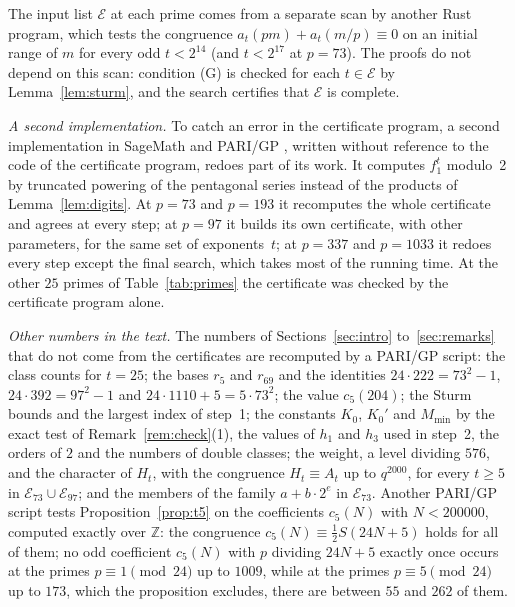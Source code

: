 \documentclass[12pt]{amsart}
\theoremstyle{definition}
\newcommand{\Z}{\mathbb{Z}}
\newcommand{\cE}{\mathcal{E}}
\begin{document}
The input list $\cE$ at each prime comes from a separate scan by another Rust program, which tests the congruence $a_t(pm)+a_t(m/p)\equiv0$ on an initial range of $m$ for every odd $t<2^{14}$ (and $t<2^{17}$ at $p=73$). The proofs do not depend on this scan: condition (G) is checked for each $t\in\cE$ by Lemma~\ref{lem:sturm}, and the search certifies that $\cE$ is complete.

\emph{A second implementation.} To catch an error in the certificate program, a second implementation in SageMath \cite{Sage} and PARI/GP \cite{PARI}, written without reference to the code of the certificate program, redoes part of its work. It computes $f_1^t$ modulo~2 by truncated powering of the pentagonal series instead of the products of Lemma~\ref{lem:digits}. At $p=73$ and $p=193$ it recomputes the whole certificate and agrees at every step; at $p=97$ it builds its own certificate, with other parameters, for the same set of exponents~$t$; at $p=337$ and $p=1033$ it redoes every step except the final search, which takes most of the running time. At the other $25$ primes of Table~\ref{tab:primes} the certificate was checked by the certificate program alone.

\emph{Other numbers in the text.} The numbers of Sections~\ref{sec:intro} to~\ref{sec:remarks} that do not come from the certificates are recomputed by a PARI/GP script: the class counts for $t=25$; the bases $r_5$ and $r_{69}$ and the identities $24\cdot222=73^2-1$, $24\cdot392=97^2-1$ and $24\cdot1110+5=5\cdot73^2$; the value $c_5(204)$; the Sturm bounds and the largest index of step~1; the constants $K_0$, $K_0'$ and $M_{\min}$ by the exact test of Remark~\ref{rem:check}(1), the values of $h_1$ and $h_3$ used in step~2, the orders of $2$ and the numbers of double classes; the weight, a level dividing $576$, and the character of $H_t$, with the congruence $H_t\equiv A_t$ up to $q^{2000}$, for every $t\ge5$ in $\cE_{73}\cup\cE_{97}$; and the members of the family $a+b\cdot2^e$ in $\cE_{73}$. Another PARI/GP script tests Proposition~\ref{prop:t5} on the coefficients $c_5(N)$ with $N<200000$, computed exactly over $\Z$: the congruence $c_5(N)\equiv\frac12S(24N+5)$ holds for all of them; no odd coefficient $c_5(N)$ with $p$ dividing $24N+5$ exactly once occurs at the primes $p\equiv1\pmod{24}$ up to $1009$, while at the primes $p\equiv5\pmod{24}$ up to $173$, which the proposition excludes, there are between $55$ and $262$ of them.
\end{document}
